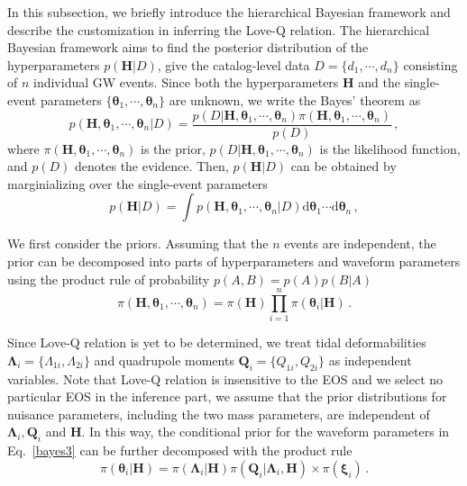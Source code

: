 \documentclass[a4paper,11pt]{article}
\begin{document}
In this subsection, we briefly introduce the hierarchical Bayesian framework and
describe the customization in inferring the Love-Q relation.
The hierarchical Bayesian framework aims to
find the posterior distribution of the hyperparameters $p(\bm{H}|D)$, give the
catalog-level data $D=\{d_1,\cdots,d_n\}$ consisting of $n$ individual GW events.
Since both the hyperparameters $\bm{H}$ and the single-event parameters
$\{\bm{\theta}_1,\cdots,\bm{\theta}_n\}$ are unknown, we write the Bayes'
theorem as 
\begin{equation}
\label{bayes2}
p(\bm{H},\bm{\theta}_1,\cdots,\bm{\theta}_n|D)=\frac{p(D|\bm{H},\bm{\theta}_1,\cdots,\bm{\theta}_n)\pi(\bm{H},\bm{\theta}_1,\cdots,\bm{\theta}_n)}{p(D)}\,,
\end{equation}
where $\pi(\bm{H},\bm{\theta}_1,\cdots,\bm{\theta}_n)$ is the prior, $p(D|\bm{H},\bm{\theta}_1,\cdots,\bm{\theta}_n)$ 
is the likelihood function, and $p(D)$ denotes the evidence. Then, $p(\bm{H}|D)$
can be obtained by 
marginializing over the single-event parameters
\begin{equation}
\label{bayes1}
p(\bm{H}|D) = \int p(\bm{H},\bm{\theta}_1,\cdots,\bm{\theta}_n|D) \text{d}\bm{\theta}_1\cdots\text{d}\bm{\theta}_n\,,
\end{equation}

We first consider the priors. Assuming that the $n$ events are independent, the 
prior can be decomposed into parts of hyperparameters and waveform parameters 
using the product rule of probability $p(A,B)=p(A)p(B|A)$
\begin{equation}
\label{bayes3}
\pi(\bm{H},\bm{\theta}_1,\cdots,\bm{\theta}_n) = \pi(\bm{H}) \prod_{i=1}^n \pi(\bm{\theta}_i|\bm{H})\,.
\end{equation}

Since Love-Q relation is yet to be determined, we treat tidal deformabilities $\bm
{\Lambda}_i=\{\Lambda_{1i},\Lambda_{2i}\}$ and quadrupole moments $\bm{Q}_i=\{Q_
{1i},Q_{2i}\}$ as independent variables. Note that Love-Q relation is insensitive 
to the EOS and we select no particular EOS in the inference part, we assume that 
the prior distributions for nuisance parameters, including the two mass 
parameters, are independent of $\bm{\Lambda}_i, \bm{Q}_i$ and $\bm{H}$. 
In this way, the conditional prior for the waveform parameters in Eq.~\eqref{bayes3} can be further decomposed with the product rule
\begin{equation}
\label{prior}
\pi(\bm{\theta}_i|\bm{H})=\pi(\bm{\Lambda}_i|\bm{H})\pi(\bm{Q}_i|\bm{\Lambda}_i,\bm{H})\times\pi(\bm{\xi}_i)\,.
\end{equation}
\end{document}
